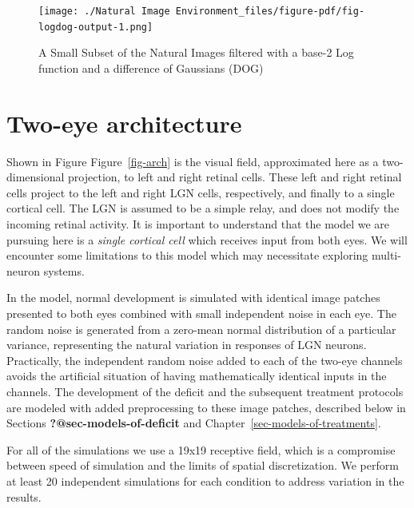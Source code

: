 \documentclass[
  letterpaper,
  DIV=11,
  numbers=noendperiod]{scrreprt}
\begin{document}
\begin{figure}[H]

{\centering \texttt{[image: ./Natural Image Environment\_files/figure-pdf/fig-logdog-output-1.png]}

}

\caption{\label{fig-logdog}A Small Subset of the Natural Images filtered
with a base-2 Log function and a difference of Gaussians (DOG)}

\end{figure}

\hypertarget{two-eye-architecture}{%
\section{Two-eye architecture}\label{two-eye-architecture}}

Shown in Figure Figure~\ref{fig-arch} is the visual field, approximated
here as a two-dimensional projection, to left and right retinal cells.
These left and right retinal cells project to the left and right LGN
cells, respectively, and finally to a single cortical cell. The LGN is
assumed to be a simple relay, and does not modify the incoming retinal
activity. It is important to understand that the model we are pursuing
here is a \emph{single cortical cell} which receives input from both
eyes. We will encounter some limitations to this model which may
necessitate exploring multi-neuron systems.

In the model, normal development is simulated with identical image
patches presented to both eyes combined with small independent noise in
each eye. The random noise is generated from a zero-mean normal
distribution of a particular variance, representing the natural
variation in responses of LGN neurons. Practically, the independent
random noise added to each of the two-eye channels avoids the artificial
situation of having mathematically identical inputs in the channels. The
development of the deficit and the subsequent treatment protocols are
modeled with added preprocessing to these image patches, described below
in Sections \textbf{?@sec-models-of-deficit} and
Chapter~\ref{sec-models-of-treatments}.

For all of the simulations we use a 19x19 receptive field, which is a
compromise between speed of simulation and the limits of spatial
discretization. We perform at least 20 independent simulations for each
condition to address variation in the results.
\end{document}
